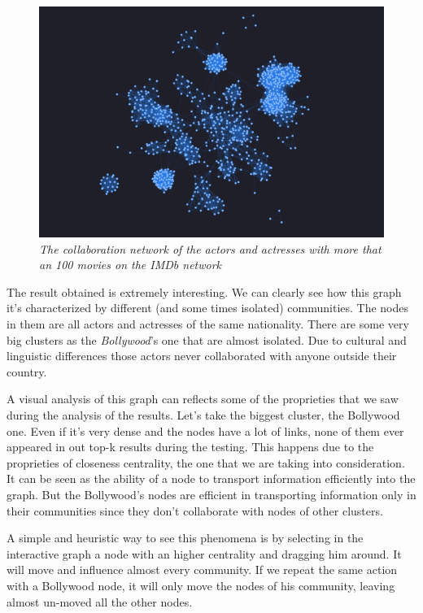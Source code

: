\begin{center}
    \s \nd {}
\end{center}

\begin{figure}[H] \label{imdb-a-network}
    \centering
    \includegraphics[width=13cm]{Screenshot.png}
    \caption{\emph{The collaboration network of the actors and actresses with more that an 100 movies on the IMDb network}}
\end{figure}

The result obtained is extremely interesting. We can clearly see how this graph it's characterized by different (and some times isolated) communities. The nodes in them are all actors and actresses of the same nationality. There are some very big clusters as the \emph{Bollywood}'s one that are almost isolated. Due to cultural and linguistic differences those actors never collaborated with anyone outside their country. \s

A visual analysis of this graph can reflects some of the proprieties that we saw during the analysis of the results. Let's take the biggest cluster, the Bollywood one. Even if it's very dense and the nodes have a lot of links, none of them ever appeared in out top-k results during the testing. This happens due to the proprieties of closeness centrality, the one that we are taking into consideration. It can be seen as the ability of a node to transport information efficiently into the graph. But the Bollywood's nodes are efficient in transporting information only in their communities since they don't collaborate with nodes of other clusters. \s

A simple and heuristic way to see this phenomena is by selecting in the interactive graph a node with an higher centrality and dragging him around. It will move and influence almost every community. If we repeat the same action with a Bollywood node, it will only move the nodes of his community, leaving almost un-moved all the other nodes.

